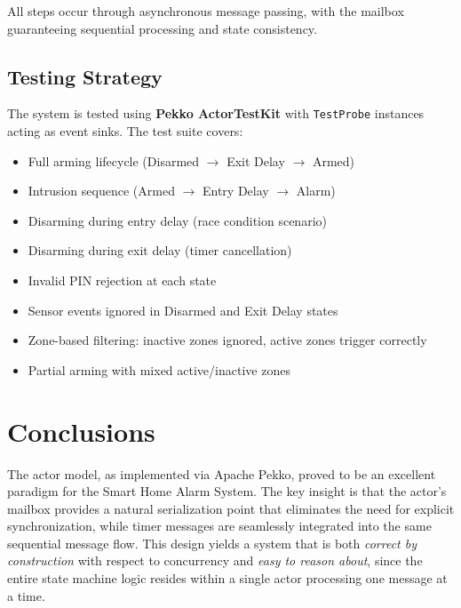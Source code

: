 \documentclass[a4paper, 12pt]{article}
\begin{document}
All steps occur through asynchronous message passing, with the mailbox guaranteeing sequential processing and state consistency.

\subsection{Testing Strategy}

The system is tested using \textbf{Pekko ActorTestKit} with \texttt{TestProbe} instances acting as event sinks. The test suite covers:

\begin{itemize}
  \item Full arming lifecycle (Disarmed $\rightarrow$ Exit Delay $\rightarrow$ Armed)
  \item Intrusion sequence (Armed $\rightarrow$ Entry Delay $\rightarrow$ Alarm)
  \item Disarming during entry delay (race condition scenario)
  \item Disarming during exit delay (timer cancellation)
  \item Invalid PIN rejection at each state
  \item Sensor events ignored in Disarmed and Exit Delay states
  \item Zone-based filtering: inactive zones ignored, active zones trigger correctly
  \item Partial arming with mixed active/inactive zones
\end{itemize}

\section{Conclusions}

The actor model, as implemented via Apache Pekko, proved to be an excellent paradigm for the Smart Home Alarm System. The key insight is that the actor's mailbox provides a natural serialization point that eliminates the need for explicit synchronization, while timer messages are seamlessly integrated into the same sequential message flow. This design yields a system that is both \emph{correct by construction} with respect to concurrency and \emph{easy to reason about}, since the entire state machine logic resides within a single actor processing one message at a time.
\end{document}
